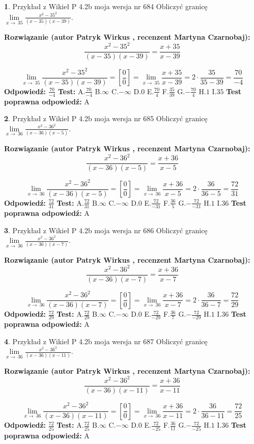 \documentclass[12pt, a4paper]{article}
\theoremstyle{definition} %
\newtheorem{zad}{}
\newcommand{\zadStart}[1]{\begin{zad}#1\newline}
\newcommand{\zadStop}{\end{zad}}
\newcommand{\rozwStart}[2]{\noindent \textbf{Rozwiązanie (autor #1 , recenzent #2): }\newline}
\newcommand{\rozwStop}{\newline}
\newcommand{\odpStart}{\noindent \textbf{Odpowiedź:}\newline}
\newcommand{\odpStop}{\newline}
\newcommand{\testStart}{\noindent \textbf{Test:}\newline}
\newcommand{\testStop}{\newline}
\newcommand{\kluczStart}{\noindent \textbf{Test poprawna odpowiedź:}\newline}
\newcommand{\kluczStop}{\newline}
\begin{document}
\zadStart{Przykład z Wikieł P 4.2b moja wersja nr 684}
Obliczyć granicę $\lim\limits_{x\to\ 35}\frac{x^{2}-35^{2}}{(x-35)(x-39)}$.
\zadStop
\rozwStart{Patryk Wirkus}{Martyna Czarnobaj}
$$\frac{x^{2}-35^{2}}{(x-35)(x-39)}=\frac{x+35}{x-39}$$

$$\lim\limits_{x\to\ 35}\frac{x^{2}-35^{2}}{(x-35)(x-39)}=[\frac{0}{0}]=\lim\limits_{x\to\ 35}\frac{x+35}{x-39}=2 \cdot \frac{35}{35-39} = \frac{70}{-4}$$
\rozwStop
\odpStart
$\frac{70}{-4}$
\odpStop
\testStart
A.$\frac{70}{-4}$
B.$\infty$
C.$-\infty$
D.$0$
E.$\frac{70}{4}$
F.$\frac{35}{39}$
G.$-\frac{70}{4}$
H.$1$
I.$35$
\testStop
\kluczStart
A
\kluczStop



\zadStart{Przykład z Wikieł P 4.2b moja wersja nr 685}
Obliczyć granicę $\lim\limits_{x\to\ 36}\frac{x^{2}-36^{2}}{(x-36)(x-5)}$.
\zadStop
\rozwStart{Patryk Wirkus}{Martyna Czarnobaj}
$$\frac{x^{2}-36^{2}}{(x-36)(x-5)}=\frac{x+36}{x-5}$$

$$\lim\limits_{x\to\ 36}\frac{x^{2}-36^{2}}{(x-36)(x-5)}=[\frac{0}{0}]=\lim\limits_{x\to\ 36}\frac{x+36}{x-5}=2 \cdot \frac{36}{36-5} = \frac{72}{31}$$
\rozwStop
\odpStart
$\frac{72}{31}$
\odpStop
\testStart
A.$\frac{72}{31}$
B.$\infty$
C.$-\infty$
D.$0$
E.$\frac{72}{-31}$
F.$\frac{36}{5}$
G.$-\frac{72}{-31}$
H.$1$
I.$36$
\testStop
\kluczStart
A
\kluczStop



\zadStart{Przykład z Wikieł P 4.2b moja wersja nr 686}
Obliczyć granicę $\lim\limits_{x\to\ 36}\frac{x^{2}-36^{2}}{(x-36)(x-7)}$.
\zadStop
\rozwStart{Patryk Wirkus}{Martyna Czarnobaj}
$$\frac{x^{2}-36^{2}}{(x-36)(x-7)}=\frac{x+36}{x-7}$$

$$\lim\limits_{x\to\ 36}\frac{x^{2}-36^{2}}{(x-36)(x-7)}=[\frac{0}{0}]=\lim\limits_{x\to\ 36}\frac{x+36}{x-7}=2 \cdot \frac{36}{36-7} = \frac{72}{29}$$
\rozwStop
\odpStart
$\frac{72}{29}$
\odpStop
\testStart
A.$\frac{72}{29}$
B.$\infty$
C.$-\infty$
D.$0$
E.$\frac{72}{-29}$
F.$\frac{36}{7}$
G.$-\frac{72}{-29}$
H.$1$
I.$36$
\testStop
\kluczStart
A
\kluczStop



\zadStart{Przykład z Wikieł P 4.2b moja wersja nr 687}
Obliczyć granicę $\lim\limits_{x\to\ 36}\frac{x^{2}-36^{2}}{(x-36)(x-11)}$.
\zadStop
\rozwStart{Patryk Wirkus}{Martyna Czarnobaj}
$$\frac{x^{2}-36^{2}}{(x-36)(x-11)}=\frac{x+36}{x-11}$$

$$\lim\limits_{x\to\ 36}\frac{x^{2}-36^{2}}{(x-36)(x-11)}=[\frac{0}{0}]=\lim\limits_{x\to\ 36}\frac{x+36}{x-11}=2 \cdot \frac{36}{36-11} = \frac{72}{25}$$
\rozwStop
\odpStart
$\frac{72}{25}$
\odpStop
\testStart
A.$\frac{72}{25}$
B.$\infty$
C.$-\infty$
D.$0$
E.$\frac{72}{-25}$
F.$\frac{36}{11}$
G.$-\frac{72}{-25}$
H.$1$
I.$36$
\testStop
\kluczStart
A
\kluczStop
\end{document}
